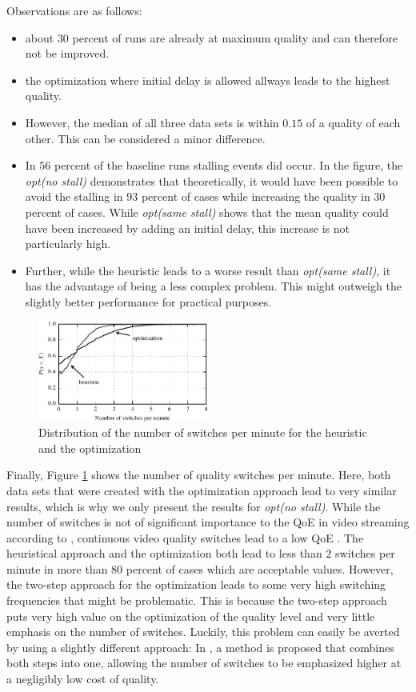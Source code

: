 Observations are as follows:
\begin{itemize}
\item about $30$ percent of runs are already at maximum quality and can therefore not be improved.
\item the optimization where initial delay is allowed allways leads to the highest quality.
\item However, the median of all three data sets is within $0.15$ of a quality of each other. This can be considered a minor difference.
\item In $56$ percent of the baseline runs stalling events did occur. In the figure, the \textit{opt(no stall)} demonstrates that theoretically, it would have been possible to avoid the stalling in $93$ percent of cases while increasing the quality in $30$ percent of cases. While \textit{opt(same stall)} shows that the mean quality could have been increased by adding an initial delay, this increase is not particularly high.
\item Further, while the heuristic leads to a worse result than \textit{opt(same stall)}, it has the advantage of being a less complex problem. This might outweigh the slightly better performance for practical purposes.
\end{itemize}

\begin{figure}[t]
\centering
\includegraphics[width=0.5\textwidth]{figs/switches_py}%
\caption{Distribution of the number of switches per minute for the heuristic and the optimization}
\label{fig:switches}%
\end{figure}

Finally, Figure \ref{fig:switches} shows the number of quality switches per minute. Here, both data sets that were created with the optimization approach lead to very similar results, which is why we only present the results for \textit{opt(no stall)}. While the number of switches is not of significant importance to the QoE in video streaming according to \cite{seufert2015survey}, continuous video quality switches lead to a low QoE \cite{liu2013user}. The heuristical approach and the optimization both lead to less than $2$ switches per minute in more than $80$ percent of cases which are acceptable values. However, the two-step approach for the optimization leads to some very high switching frequencies that might be problematic. This is because the two-step approach puts very high value on the optimization of the quality level and very little emphasis on the number of switches. Luckily, this problem can easily be averted by using a slightly different approach: In \cite{liotou2016enriching}, a method is proposed that combines both steps into one, allowing the number of switches to be emphasized higher at a negligibly low cost of quality.

